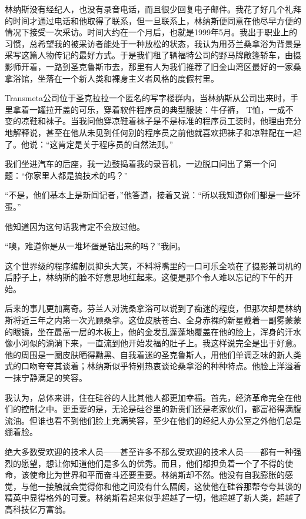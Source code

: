 \documentclass[12pt,UTF8]{ctexbook}
\begin{document}
林纳斯没有经纪人，也没有录音电话，而且很少回复电子邮件。我花了好几个礼拜的时间才通过电话和他取得了联系，但一旦联系上，林纳斯便同意在他尽早方便的情况下接受一次采访。时间大约在一个月后，也就是1999年5月。我出于职业上的习惯，总希望我的被采访者能处于一种放松的状态，我认为用芬兰桑拿浴为背景是采写这篇人物传记的最好方式。于是我们租了辆福特公司的野马牌敞篷轿车，由摄影师开着，一路到圣克鲁斯市去，那里有人为我们推荐了旧金山湾区最好的一家桑拿浴馆，坐落在一个新人类和裸身主义者风格的度假村里。

Transmeta公司位于圣克拉拉一个匿名的写字楼群内，当林纳斯从公司出来时，手里拿着一罐拉开盖的可乐，穿着软件程序员的典型服装：牛仔裤， T恤，一成不变的凉鞋和袜子。当我问他穿凉鞋着袜子是不是标准的程序员工装时，他理由充分地解释说，甚至在他从未见到任何别的程序员之前他就喜欢把袜子和凉鞋配在一起了。他说：“这肯定是关于程序员的自然法则。”

我们坐进汽车的后座，我一边鼓捣着我的录音机，一边脱口问出了第一个问题：“你家里人都是搞技术的吗？”

“不是，他们基本上是新闻记者，”他答道，接着又说：“所以我知道你们都是一些坏蛋。”

他知道因为这句话我肯定不会放过他。

“噢，难道你是从一堆坏蛋是钻出来的吗？”我问。

这个世界级的程序编制员抑头大笑，不料将嘴里的一口可乐全喷在了摄影兼司机的后脖子上，林纳斯的脸不好意思地红起来。这便是那个令人难以忘记的下午的开始。

后来的事儿更加离奇。芬兰人对洗桑拿浴可以说到了痴迷的程度，但那次却是林纳斯将近三年之内第一次光顾桑拿。这位皮肤苍白、全身赤裸的新星戴着一副雾蒙蒙的眼镜，坐在最高一层的木板上，他的金发乱蓬蓬地覆盖在他的脸上，浑身的汗水像小河似的滴淌下来，一直流到他开始发福的肚子上。我这样说完全是出于好意。他的周围是一圈皮肤晒得黝黑、自我着迷的圣克鲁斯人，用他们单调乏味的新人类式的口吻夸夸其谈着；林纳斯似乎特别热衷谈论桑拿浴的种种特点。他脸上洋溢着一抹宁静满足的笑容。

我认为，总体来讲，住在硅谷的人比其他人都更加幸福。首先，经济革命完全在他们的控制之中。更重要的是，无论是硅谷里的新贵们还是老家伙们，都富裕得满腹流油。但谁也看不到他们脸上充满笑容，至少在他们的经纪人办公室之外他们总是绷着脸。

绝大多数受欢迎的技术人员——甚至许多不那么受欢迎的技术人员——都有一种强烈的愿望，想让你知道他们是多么的优秀。而且，他们都担负着一个了不得的使命，该使命比为世界和平而奋斗还要重要。林纳斯却不然。他没有自我膨胀的感觉，与他一接触就会觉得你和他之间没有什么隔阂，这使他在硅谷那帮夸夸其谈的精英中显得格外的可爱。林纳斯看起来似乎超越了一切，他超越了新人类，超越了高科技亿万富翁。
\end{document}
